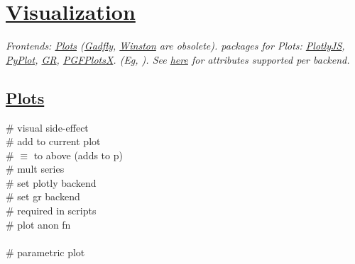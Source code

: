\section{\href{https://docs.juliaplots.org/latest/input\_data/}{Visualization}}

\textit{Frontends: \href{http://docs.juliaplots.org/latest/}{Plots} (\href{http://gadflyjl.org/stable/}{Gadfly},  \href{https://github.com/JuliaGraphics/Winston.jl}{Winston} are obsolete).  packages for Plots: \href{https://github.com/plotly/Plotly.jl}{PlotlyJS}, \href{https://github.com/JuliaPy/PyPlot.jl}{PyPlot}, \href{https://github.com/jheinen/GR.jl}{GR}, \href{https://kristofferc.github.io/PGFPlotsX.jl/stable/}{PGFPlotsX}. (Eg, \texttt{}). See \href{https://docs.juliaplots.org/latest/generated/supported/}{here} for attributes supported per backend.}


\subsection*{\href{http://docs.juliaplots.org/latest/}{Plots}}
 \# visual side-effect \\
 \# add to current plot \\
 \# $\equiv$ to above (adds to p) \\
 \# mult series \\
 \# set plotly backend \\
 \# set gr backend \\
 \# required in scripts\\
 \# plot anon fn \\
  \\
 \# parametric plot \\


